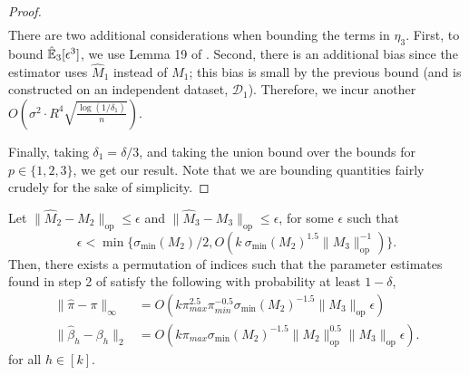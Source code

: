 \documentclass[tablecaption=bottom]{jmlr}
\newcommand\sD{\ensuremath{\mathcal{D}}}
\newcommand\sigmamin{\sigma_\textrm{min}}
\newcommand\op{{\textrm{op}}}
\begin{document}
\begin{proof}
{\begin{align*}
\end{align*}
}
There are two additional considerations when bounding the terms in $\eta_3$.
First, to bound $\hat{\operatorname{\mathbb{E}}}_3[\epsilon^3]$, we use Lemma 19 of \cite{hsu13spherical}.
Second, there is an additional bias since the estimator uses $\hat M_1$ instead of $M_1$; this bias is small by the previous bound (and is constructed on an independent dataset, $\sD_1$).
Therefore, we incur another $O(\sigma^2 \cdot R^4 \sqrt{\frac{\log(1/\delta_1)}{n}})$.

Finally, taking $\delta_1 = \delta/3$, and taking the union bound over the bounds for $p \in \{1,2,3\}$,
we get our result.
Note that we are bounding quantities fairly crudely for the sake of simplicity.
\end{proof}


\begin{lemma}
  \label{lem:tensorPower} Let $\|\hat M_2 - M_2\|_\op \le \epsilon$ and
  $\|\hat M_3 - M_3\|_\op \le \epsilon$, for some $\epsilon$ such that 
  $$\epsilon < \min\{\sigmamin(M_2)/2,O(k ~\sigmamin(M_2)^{1.5} \|M_3\|_\op^{-1})\}.$$ 
  Then, there exists a permutation of indices such that  the parameter
  estimates found in step 2 of 
  satisfy the following with probability at least $1 - \delta$,
  \begin{align*}
  \|\hat \pi - \pi \|_{\infty}
    &= O( k \pi_{max}^{2.5} \pi_{min}^{-0.5} \sigmamin(M_2)^{-1.5} \|M_3\|_\op \epsilon ) \\
  \|\hat \beta_h - \beta_h\|_2
    &= O( k \pi_{max} \sigmamin(M_2)^{-1.5} \|M_2\|_\op^{0.5} \|M_3\|_\op \epsilon ).
  \end{align*}
  for all $h \in [k]$.
\end{lemma}
\end{document}
